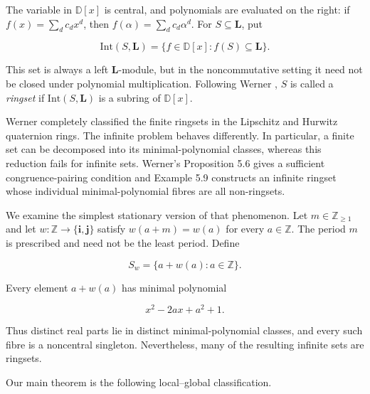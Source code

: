 \documentclass[11pt]{article}
\theoremstyle{remark}
\numberwithin{equation}{section}
\begin{document}
The variable in $\mathbb D[x]$ is central, and polynomials are evaluated on
the right: if $f(x)=\sum_d c_dx^d$, then
$f(\alpha)=\sum_d c_d\alpha^d$. For $S\subseteq\mathbf L$, put

\[
\mathrm{Int}(S,\mathbf L)
=\{f\in\mathbb D[x]:f(S)\subseteq\mathbf L\}.
\]

This set is always a left $\mathbf L$-module, but in the noncommutative
setting it need not be closed under polynomial multiplication. Following
Werner \cite{werner2026}, $S$ is called a \emph{ringset} if
$\mathrm{Int}(S,\mathbf L)$ is a subring of $\mathbb D[x]$.

Werner \cite{werner2026} completely classified the finite ringsets in the Lipschitz and
Hurwitz quaternion rings. The infinite problem behaves differently. In
particular, a finite set can be decomposed into its minimal-polynomial
classes, whereas this reduction fails for infinite sets. Werner's
Proposition 5.6 gives a sufficient congruence-pairing condition and Example
5.9 constructs an infinite ringset whose individual minimal-polynomial
fibres are all non-ringsets.

We examine the simplest stationary version of that phenomenon. Let
$m\in\mathbb Z_{\ge1}$ and let
$w:\mathbb Z\to\{\mathbf i,\mathbf j\}$ satisfy $w(a+m)=w(a)$ for every
$a\in\mathbb Z$. The period $m$ is prescribed and need not be the least
period. Define

\[
S_w=\{a+w(a):a\in\mathbb Z\}.
\]

Every element $a+w(a)$ has minimal polynomial

\[
x^2-2ax+a^2+1.
\]

Thus distinct real parts lie in distinct minimal-polynomial classes, and
every such fibre is a noncentral singleton. Nevertheless, many of the
resulting infinite sets are ringsets.

Our main theorem is the following local--global classification.
\end{document}

